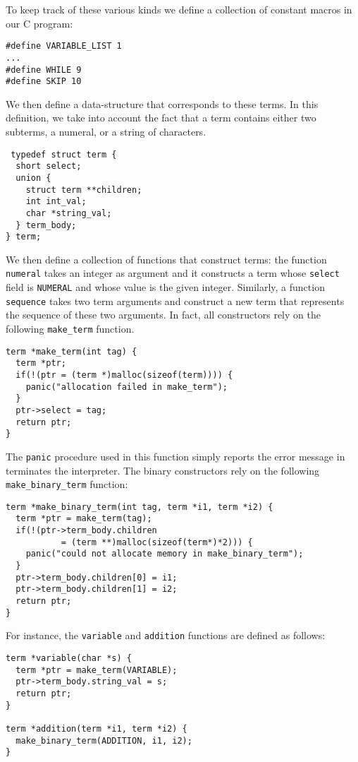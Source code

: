 \documentclass{book}
\begin{document}
To keep track of these various kinds we define a collection of constant
macros in our C program:

\begin{verbatim}
#define VARIABLE_LIST 1
...
#define WHILE 9
#define SKIP 10
\end{verbatim}

We then define a data-structure that corresponds to these terms.  In
this definition, we take into account the fact that a term contains
either two subterms, a numeral, or a string of characters.

\begin{verbatim}
 typedef struct term {
  short select;
  union {
    struct term **children;
    int int_val;
    char *string_val;
  } term_body;
} term;
\end{verbatim}

We then define a collection of functions that construct terms:
the function {\tt numeral} takes an integer as argument and
it constructs a term whose {\tt select} field is {\tt NUMERAL} and whose
value is the given integer.  Similarly, a function {\tt sequence}
takes two term arguments and construct a new term that represents the sequence
of these two arguments.  In fact, all constructors rely on the following
{\tt make\_term} function.
\begin{verbatim}
term *make_term(int tag) {
  term *ptr;
  if(!(ptr = (term *)malloc(sizeof(term)))) {
    panic("allocation failed in make_term");
  }
  ptr->select = tag;
  return ptr;
}
\end{verbatim}
The {\tt panic} procedure used in this function simply reports the error
message in terminates the interpreter.  The binary constructors rely on
the following {\tt make\_binary\_term} function:
\begin{verbatim}
term *make_binary_term(int tag, term *i1, term *i2) {
  term *ptr = make_term(tag);
  if(!(ptr->term_body.children 
           = (term **)malloc(sizeof(term*)*2))) {
    panic("could not allocate memory in make_binary_term");
  }
  ptr->term_body.children[0] = i1;
  ptr->term_body.children[1] = i2;
  return ptr;
}
\end{verbatim}
For instance, the {\tt variable} and {\tt addition} functions
are defined as follows:
\begin{verbatim}
term *variable(char *s) {
  term *ptr = make_term(VARIABLE);
  ptr->term_body.string_val = s;
  return ptr;
}

term *addition(term *i1, term *i2) {
  make_binary_term(ADDITION, i1, i2);
}
\end{verbatim}
\end{document}
